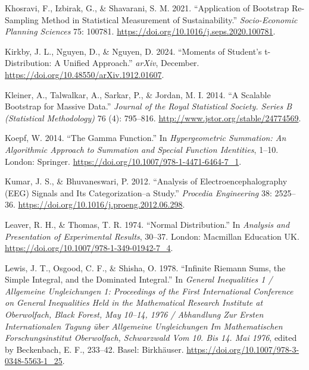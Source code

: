 \documentclass[
]{article}
\newlength{\cslhangindent}
\newlength{\cslentryspacingunit} %
\newenvironment{CSLReferences}[2] %
 {%
  \setlength{\parindent}{0pt}
  \ifodd #1
  \let\oldpar\par
  \def\par{\hangindent=\cslhangindent\oldpar}
  \fi
  \setlength{\parskip}{#2\cslentryspacingunit}
 }%
 {}
\begin{document}
\begin{CSLReferences}{1}{0}
\leavevmode{}%
Khosravi, F., Izbirak, G., \& Shavarani, S. M. 2021. {``Application of
Bootstrap Re-Sampling Method in Statistical Measurement of
Sustainability.''} \emph{Socio-Economic Planning Sciences} 75: 100781.
\url{https://doi.org/10.1016/j.seps.2020.100781}.

\leavevmode{}%
Kirkby, J. L., Nguyen, D., \& Nguyen, D. 2024. {``Moments of Student's
t-Distribution: A Unified Approach.''} \emph{arXiv}, December.
\url{https://doi.org/10.48550/arXiv.1912.01607}.

\leavevmode{}%
Kleiner, A., Talwalkar, A., Sarkar, P., \& Jordan, M. I. 2014. {``A
Scalable Bootstrap for Massive Data.''} \emph{Journal of the Royal
Statistical Society. Series B (Statistical Methodology)} 76 (4):
795--816. \url{http://www.jstor.org/stable/24774569}.

\leavevmode{}%
Koepf, W. 2014. {``The Gamma Function.''} In \emph{Hypergeometric
Summation: An Algorithmic Approach to Summation and Special Function
Identities}, 1--10. London: Springer.
\url{https://doi.org/10.1007/978-1-4471-6464-7_1}.

\leavevmode{}%
Kumar, J. S., \& Bhuvaneswari, P. 2012. {``Analysis of
Electroencephalography (EEG) Signals and Its Categorization--a Study.''}
\emph{Procedia Engineering} 38: 2525--36.
\url{https://doi.org/10.1016/j.proeng.2012.06.298}.

\leavevmode{}%
Leaver, R. H., \& Thomas, T. R. 1974. {``Normal Distribution.''} In
\emph{Analysis and Presentation of Experimental Results}, 30--37.
London: Macmillan Education UK.
\url{https://doi.org/10.1007/978-1-349-01942-7_4}.

\leavevmode{}%
Lewis, J. T., Osgood, C. F., \& Shisha, O. 1978. {``Infinite Riemann
Sums, the Simple Integral, and the Dominated Integral.''} In
\emph{General Inequalities 1 / Allgemeine Ungleichungen 1: Proceedings
of the First International Conference on General Inequalities Held in
the Mathematical Research Institute at Oberwolfach, Black Forest, May
10--14, 1976 / Abhandlung Zur Ersten Internationalen Tagung {ü}ber
Allgemeine Ungleichungen Im Mathematischen Forschungsinstitut
Oberwolfach, Schwarzwald Vom 10. Bis 14. Mai 1976}, edited by
Beckenbach, E. F., 233--42. Basel: Birkhäuser.
\url{https://doi.org/10.1007/978-3-0348-5563-1_25}.


\end{CSLReferences}
\end{document}
